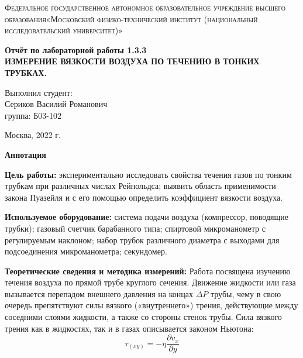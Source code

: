 \documentclass[a4paper, 12pt]{article}%
\begin{document}
	\begin{titlepage}
		\begin{center}
			\textsc{Федеральное государственное автономное образовательное учреждение высшего образования«Московский физико-технический институт (национальный исследовательский университет)»\\[5mm]
			}
			
			\vfill
			
			\textbf{Отчёт по лабораторной работы 1.3.3\\[3mm]
				ИЗМЕРЕНИЕ ВЯЗКОСТИ ВОЗДУХА ПО
				ТЕЧЕНИЮ В ТОНКИХ ТРУБКАХ.
				\\[50mm]
			}
			
		\end{center}
		
		\hfill
		\begin{minipage}{.5\textwidth}
			Выполнил студент:\\[2mm]
			Сериков Василий Романович\\[2mm]
			группа: Б03-102\\[5mm]
			
		\end{minipage}
		\vfill
		\begin{center}
			Москва, 2022 г.
		\end{center}
		
	\end{titlepage}
	
	\newpage

\textbf{Аннотация}


\textbf{Цель работы:} экспериментально исследовать свойства течения газов по тонким трубкам при различных числах Рейнольдса; выявить область применимости закона Пуазейля и с его помощью определить коэффициент вязкости воздуха.

\textbf{Используемое оборудование:} система подачи воздуха (компрессор, поводящие трубки); газовый счетчик барабанного типа; спиртовой микроманометр с регулируемым наклоном; набор трубок различного диаметра с выходами для подсоединения микроманометра; секундомер.

	\textbf{Теоретические сведения и методика измерений:} Работа посвящена изучению течения воздуха по прямой трубе круглого сечения. Движение жидкости или газа вызывается перепадом внешнего давления на концах $\Delta P$ трубы, чему в свою очередь препятствуют силы вязкого
	(«внутреннего») трения, действующие между соседними слоями жидкости, а также со стороны стенок трубы. Сила вязкого трения как в жидкостях, так и в газах описывается законом
	Ньютона: $$ \tau_(xy) = -\eta \frac{\partial v_x}{\partial y}$$
	
\end{document}
